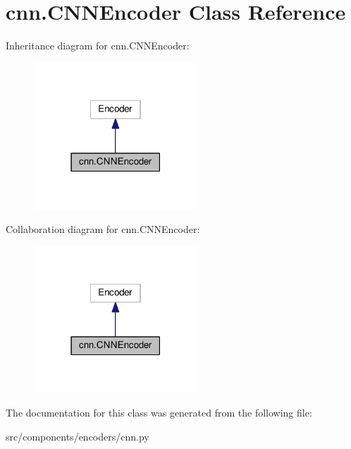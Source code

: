 \hypertarget{classcnn_1_1CNNEncoder}{}\section{cnn.\+C\+N\+N\+Encoder Class Reference}
\label{classcnn_1_1CNNEncoder}


Inheritance diagram for cnn.\+C\+N\+N\+Encoder\+:
\nopagebreak
\begin{figure}[H]
\begin{center}
\leavevmode
\includegraphics[width=174pt]{classcnn_1_1CNNEncoder__inherit__graph}
\end{center}
\end{figure}


Collaboration diagram for cnn.\+C\+N\+N\+Encoder\+:
\nopagebreak
\begin{figure}[H]
\begin{center}
\leavevmode
\includegraphics[width=174pt]{classcnn_1_1CNNEncoder__coll__graph}
\end{center}
\end{figure}


The documentation for this class was generated from the following file\+:\begin{DoxyCompactItemize}
\item 
src/components/encoders/cnn.\+py\end{DoxyCompactItemize}
